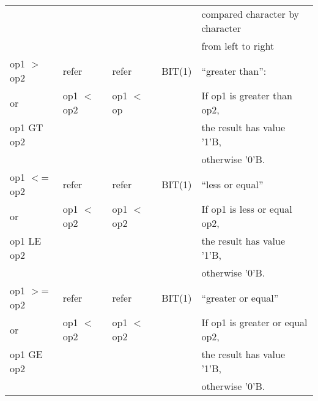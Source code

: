 \begin{table}
\begin{center}
\begin{tabular}{|l|l|l|l|l|}
                 &                 &                 &                      & compared character by character \\
                 &                 &                 &                      & from left to right \\ \hline
op1 $>$ op2      & refer         & refer         & BIT(1)               & ``greater than'':\\
or               & op1 $<$ op2     & op1 $<$ op      &                      & If op1 is greater than op2,\\
op1 GT op2
\index{GT@\textbf{GT}|textbf}
       &                 &                 &                      & the result has value '1'B,\\
                 &                 &                 &                      & otherwise '0'B.\\ \hline

op1 $<$= op2     & refer         & refer         & BIT(1)               & ``less or equal''\\
or               & op1 $<$ op2     & op1 $<$ op2     &                      & If op1 is less or equal op2,\\
op1 LE op2
\index{LE@\textbf{LE}|textbf}
       &                 &                 &                      & the result has value '1'B,\\
                 &                 &                 &                      & otherwise '0'B.\\ \hline

op1 $>$= op2     & refer         & refer         & BIT(1)               & ``greater or equal''\\
or               & op1 $<$ op2     & op1 $<$ op2     &                      & If op1 is greater or equal op2,\\
op1 GE op2
\index{GE@\textbf{GE}|textbf}
       &                 &                 &                      & the result has value '1'B,\\
                 &                 &                 &                      & otherwise '0'B.\\ \hline


\end{tabular}
\end{center}
\end{table}
